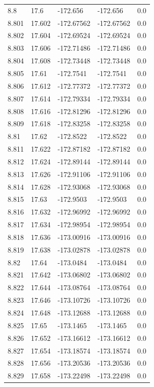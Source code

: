 \begin{tabular}{lllll}
8.8 & 17.6 & -172.656 & -172.656 & 0.0 \\
8.801 & 17.602 & -172.67562 & -172.67562 & 0.0 \\
8.802 & 17.604 & -172.69524 & -172.69524 & 0.0 \\
8.803 & 17.606 & -172.71486 & -172.71486 & 0.0 \\
8.804 & 17.608 & -172.73448 & -172.73448 & 0.0 \\
8.805 & 17.61 & -172.7541 & -172.7541 & 0.0 \\
8.806 & 17.612 & -172.77372 & -172.77372 & 0.0 \\
8.807 & 17.614 & -172.79334 & -172.79334 & 0.0 \\
8.808 & 17.616 & -172.81296 & -172.81296 & 0.0 \\
8.809 & 17.618 & -172.83258 & -172.83258 & 0.0 \\
8.81 & 17.62 & -172.8522 & -172.8522 & 0.0 \\
8.811 & 17.622 & -172.87182 & -172.87182 & 0.0 \\
8.812 & 17.624 & -172.89144 & -172.89144 & 0.0 \\
8.813 & 17.626 & -172.91106 & -172.91106 & 0.0 \\
8.814 & 17.628 & -172.93068 & -172.93068 & 0.0 \\
8.815 & 17.63 & -172.9503 & -172.9503 & 0.0 \\
8.816 & 17.632 & -172.96992 & -172.96992 & 0.0 \\
8.817 & 17.634 & -172.98954 & -172.98954 & 0.0 \\
8.818 & 17.636 & -173.00916 & -173.00916 & 0.0 \\
8.819 & 17.638 & -173.02878 & -173.02878 & 0.0 \\
8.82 & 17.64 & -173.0484 & -173.0484 & 0.0 \\
8.821 & 17.642 & -173.06802 & -173.06802 & 0.0 \\
8.822 & 17.644 & -173.08764 & -173.08764 & 0.0 \\
8.823 & 17.646 & -173.10726 & -173.10726 & 0.0 \\
8.824 & 17.648 & -173.12688 & -173.12688 & 0.0 \\
8.825 & 17.65 & -173.1465 & -173.1465 & 0.0 \\
8.826 & 17.652 & -173.16612 & -173.16612 & 0.0 \\
8.827 & 17.654 & -173.18574 & -173.18574 & 0.0 \\
8.828 & 17.656 & -173.20536 & -173.20536 & 0.0 \\
8.829 & 17.658 & -173.22498 & -173.22498 & 0.0 \\

\end{tabular}

